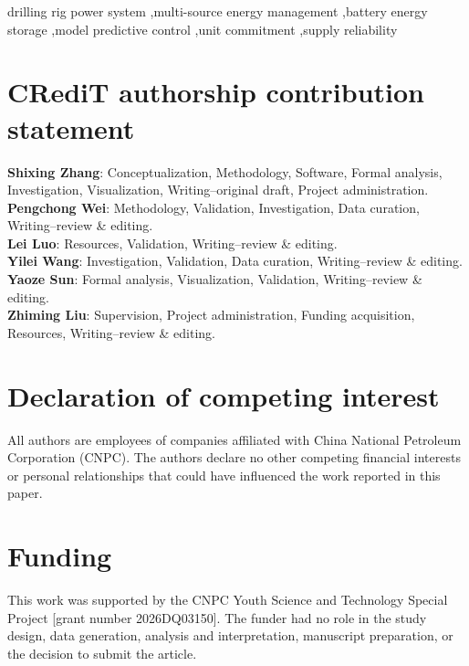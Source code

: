 \documentclass[a4paper,fleqn]{cas-sc}
\DeclareRobustCommand{\?}[1]{\u{#1}}
\DeclareRobustCommand{\>}[1]{\c{#1}}
\begin{document}
\begin{keywords}
drilling rig power system \sep multi-source energy management \sep battery energy storage \sep model predictive control \sep unit commitment \sep supply reliability
\end{keywords}

\maketitle



\section*{CRediT authorship contribution statement}
\noindent\textbf{Shixing Zhang}: Conceptualization, Methodology, Software,
Formal analysis, Investigation, Visualization, Writing--original draft, Project
administration.\\
\textbf{Pengchong Wei}: Methodology, Validation, Investigation, Data curation,
Writing--review \& editing.\\
\textbf{Lei Luo}: Resources, Validation, Writing--review \& editing.\\
\textbf{Yilei Wang}: Investigation, Validation, Data curation,
Writing--review \& editing.\\
\textbf{Yaoze Sun}: Formal analysis, Visualization, Validation,
Writing--review \& editing.\\
\textbf{Zhiming Liu}: Supervision, Project administration, Funding acquisition,
Resources, Writing--review \& editing.

\section*{Declaration of competing interest}
All authors are employees of companies affiliated with China National Petroleum
Corporation (CNPC). The authors declare no other competing financial interests
or personal relationships that could have influenced the work reported in this
paper.

\section*{Funding}
This work was supported by the CNPC Youth Science and Technology Special Project
[grant number 2026DQ03150]. The funder had no role in the study design, data
generation, analysis and interpretation, manuscript preparation, or the
decision to submit the article.
\end{document}

